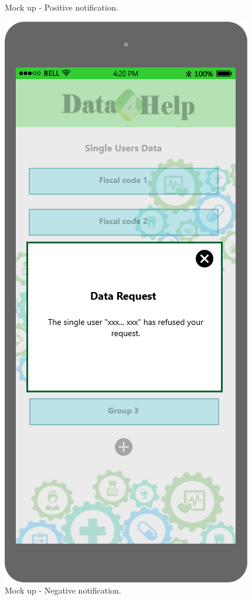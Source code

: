 \begin{figure}[h!]
\begin{minipage}[b]{0.25\textwidth}
    		\caption{Mock up - Positive notification.}
	\end{minipage}
	\hfill
 	\begin{minipage}[b]{0.25\textwidth}
    		\includegraphics[width=\textwidth]{./pictures/single_user_refuse.png}
    		\caption{Mock up - Negative notification.}
	\end{minipage}
\end{figure}

